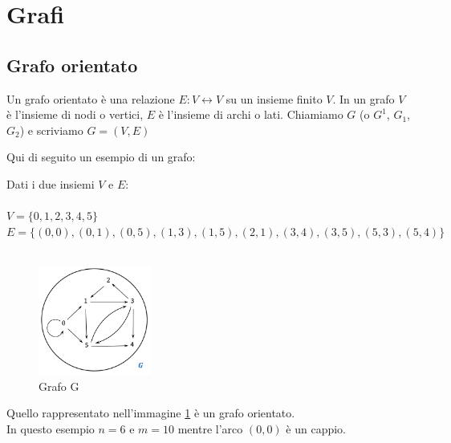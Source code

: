 \newpage
\section{Grafi}
\subsection{Grafo orientato}
\begin{definition}
Un grafo orientato è una relazione $E: V \leftrightarrow V$ su un insieme finito $V$. In un grafo $V$ è l'insieme di nodi o vertici, $E$ è l'insieme di archi o lati. Chiamiamo $G$ (o $G^1$, $G_1$, $G_2$) e scriviamo $G = (V,E)$
\end{definition}
 

\begin{example}\label{esempio-grafo-1}
    Qui di seguito un esempio di un grafo:
\end{example}
 
\hspace{-15pt}Dati i due insiemi $V$ e $E$:\\\\
$V = \{0,1,2,3,4,5\}$ \\
$E = \{(0,0), (0,1), (0,5), (1,3), (1,5), (2,1), (3,4), (3,5), (5,3), (5,4)\}$\\ \\
\begin{figure}
    \vspace{-100pt}
    \centering
    \includegraphics[width=3.7cm]{images/esempio-grafo.png}
    \vspace{-5pt}
    \caption{Grafo G}
    \label{fig:esempio-grafo}
\end{figure}
Quello rappresentato nell'immagine \ref{fig:esempio-grafo} è un grafo orientato.\\
In questo esempio $n = 6$ e $m = 10$ mentre l'arco $(0,0)$ è un cappio.

